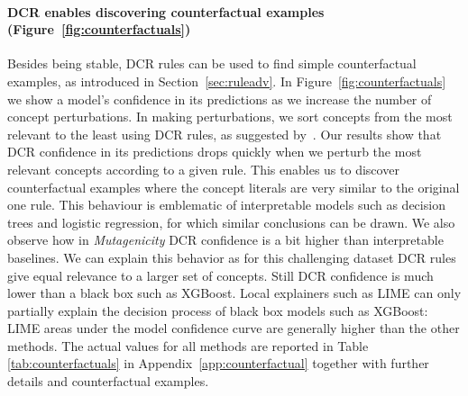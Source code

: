 \paragraph{DCR enables discovering counterfactual examples (Figure~\ref{fig:counterfactuals})}
Besides being stable, DCR rules can be used to find simple counterfactual examples, as introduced in Section~\ref{sec:ruleadv}. In Figure~\ref{fig:counterfactuals} we show a model's confidence in its predictions as we increase the number of concept perturbations. In making perturbations, we sort concepts from the most relevant to the least using DCR rules, as suggested by~\citet{wachter2017counterfactual}. 
Our results show that DCR confidence in its predictions drops quickly when we perturb the most relevant concepts according to a given rule. 
This enables us to discover counterfactual examples where the concept literals are very similar to the original one rule. 
This behaviour is emblematic of interpretable models such as decision trees and logistic regression, for which similar conclusions can be drawn. 
We also observe how in \emph{Mutagenicity} DCR confidence is a bit higher than interpretable baselines. We can explain this behavior as for this challenging dataset DCR rules give equal relevance to a larger set of concepts. Still DCR confidence is much lower than a black box such as XGBoost.
Local explainers such as LIME can only partially explain the decision process of black box models such as XGBoost: LIME areas under the model confidence curve are generally higher than the other methods. The actual values for all methods are reported in Table \ref{tab:counterfactuals} in Appendix~\ref{app:counterfactual} together with further details and counterfactual examples.

